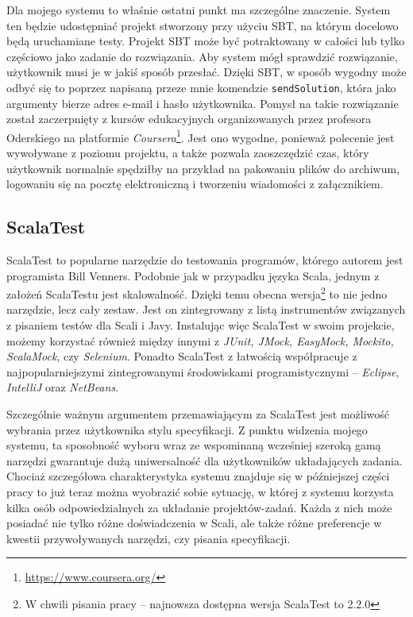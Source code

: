 \documentclass[brudnopis]{xmgr}
\begin{document}
Dla mojego systemu to właśnie ostatni punkt ma szczególne znaczenie. System ten będzie udostępniać projekt stworzony przy użyciu SBT, na którym docelowo będą uruchamiane testy. Projekt SBT może być potraktowany w całości lub tylko częściowo jako zadanie do rozwiązania. Aby system mógł sprawdzić rozwiązanie, użytkownik musi je w jakiś sposób przesłać. Dzięki SBT, w sposób wygodny może odbyć się to poprzez napisaną przeze mnie komendzie \texttt{sendSolution}, która jako argumenty bierze adres e-mail i hasło użytkownika. Pomysł na takie rozwiązanie został zaczerpnięty z kursów edukacyjnych organizowanych przez profesora Oderskiego na platformie \textit{Coursera}\footnote{\url{https://www.coursera.org/}}. Jest ono wygodne, ponieważ polecenie jest wywoływane z poziomu projektu, a także pozwala zaoszczędzić czas, który użytkownik normalnie spędziłby na przykład na pakowaniu plików do archiwum, logowaniu się na pocztę elektroniczną i tworzeniu wiadomości z załącznikiem.

\subsection{ScalaTest}

\label{scalaTestSrodek} 

ScalaTest to popularne narzędzie do testowania programów, którego autorem jest programista Bill Venners. Podobnie jak w przypadku języka Scala, jednym z założeń ScalaTestu jest skalowalność. Dzięki temu obecna wersja\footnote{W chwili pisania pracy -- najnowsza dostępna wersja ScalaTest to 2.2.0} to nie jedno narzędzie, lecz cały zestaw. Jest on zintegrowany z listą instrumentów związanych z pisaniem testów dla Scali i Javy. Instalując więc ScalaTest w swoim projekcie, możemy korzystać również między innymi z \textit{JUnit, JMock, EasyMock, Mockito, ScalaMock}, czy \textit{Selenium}. Ponadto ScalaTest z łatwością współpracuje z najpopularniejszymi zintegrowanymi środowiskami programistycznymi -- \textit{Eclipse}, \textit{IntelliJ} oraz \textit{NetBeans}.

Szczególnie ważnym argumentem przemawiającym za ScalaTest jest możliwość wybrania przez użytkownika stylu specyfikacji. Z punktu widzenia mojego systemu, ta sposobność wyboru wraz ze wspominaną wcześniej szeroką gamą narzędzi gwarantuje dużą uniwersalność dla użytkowników układających zadania. Chociaż szczegółowa charakterystyka systemu znajduje się w późniejszej części pracy to już teraz można wyobrazić sobie sytuację, w której z systemu korzysta kilka osób odpowiedzialnych za układanie projektów-zadań. Każda z nich może posiadać nie tylko różne doświadczenia w Scali, ale także różne preferencje w kwestii przywoływanych narzędzi, czy pisania specyfikacji. 
\end{document}
